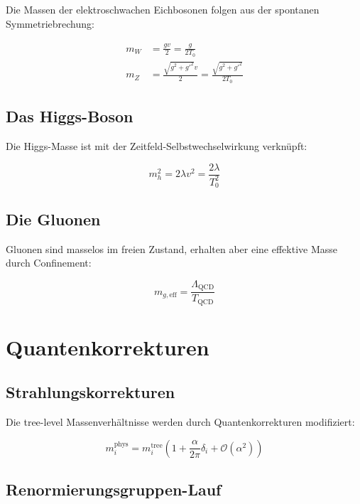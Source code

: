 \documentclass[12pt,a4paper]{report}
\begin{document}
	Die Massen der elektroschwachen Eichbosonen folgen aus der spontanen Symmetriebrechung:
	
	\begin{align}
		m_W &= \frac{g v}{2} = \frac{g}{2T_0} \\
		m_Z &= \frac{\sqrt{g^2 + g'^2} v}{2} = \frac{\sqrt{g^2 + g'^2}}{2T_0}
	\end{align}
	
	\subsection{Das Higgs-Boson}
	
	Die Higgs-Masse ist mit der Zeitfeld-Selbstwechselwirkung verknüpft:
	
	\begin{equation}
		m_h^2 = 2\lambda v^2 = \frac{2\lambda}{T_0^2}
	\end{equation}
	
	\subsection{Die Gluonen}
	
	Gluonen sind masselos im freien Zustand, erhalten aber eine effektive Masse durch Confinement:
	
	\begin{equation}
		m_{g,\text{eff}} = \frac{\Lambda_{\text{QCD}}}{T_{\text{QCD}}}
	\end{equation}
	
	\section{Quantenkorrekturen}
	
	\subsection{Strahlungskorrekturen}
	
	Die tree-level Massenverhältnisse werden durch Quantenkorrekturen modifiziert:
	
	\begin{equation}
		m_i^{\text{phys}} = m_i^{\text{tree}}\left(1 + \frac{\alpha}{2\pi}\delta_i + \mathcal{O}(\alpha^2)\right)
	\end{equation}
	
	\subsection{Renormierungsgruppen-Lauf}
	
\end{document}
